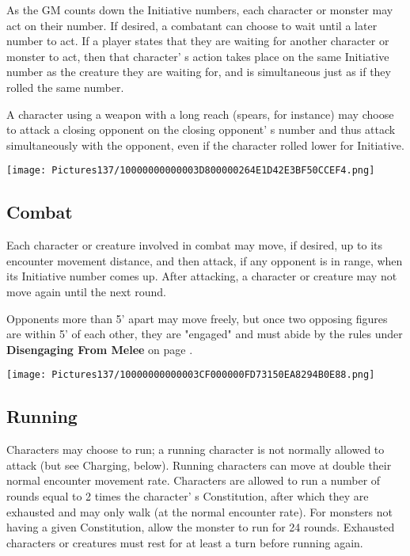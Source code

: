 \documentclass[a4paper,twoside,openany,10pt]{book}
\begin{document}
\begin{multicols}{2}
As the GM counts down the Initiative numbers, each character or monster may act on their number. If desired, a combatant can choose to wait until a later number to act. If a player states that they are waiting for another character or monster to act, then that character' s action takes place on the same Initiative number as the creature they are waiting for, and is simultaneous just as if they rolled the same number.

A character using a weapon with a long reach (spears, for instance) may choose to attack a closing opponent on the closing opponent' s number and thus attack simultaneously with the opponent, even if the character rolled lower for Initiative.

\begin{flushleft}
	\texttt{[image: Pictures137/10000000000003D800000264E1D42E3BF50CCEF4.png]}
\end{flushleft}

\subsection{Combat}\label{combat}

Each character or creature involved in combat may move, if desired, up to its encounter movement distance, and then attack, if any opponent is in range, when its Initiative number comes up. After attacking, a character or creature may not move again until the next round.

Opponents more than 5' apart may move freely, but once
two opposing figures are within 5' of each other, they
are "engaged" and must abide by the rules under \textbf{Disengaging From
Melee }on page \hyperlink{disengaging-from-melee}{\pageref{disengaging-from-melee}}.

\begin{flushleft}
	\texttt{[image: Pictures137/10000000000003CF000000FD73150EA8294B0E88.png]}
\end{flushleft}

\subsection{Running}\label{running}

Characters may choose to run; a running character is not normally allowed to attack (but see Charging, below). Running characters can move at double their normal encounter movement rate. Characters are allowed to run a number of rounds equal to 2 times the character' s Constitution, after which they are exhausted and may only walk (at the normal encounter rate). For monsters not having a given Constitution, allow the monster to run for 24 rounds. Exhausted characters or creatures must rest for at least a turn before running again.


\end{multicols}
\end{document}
